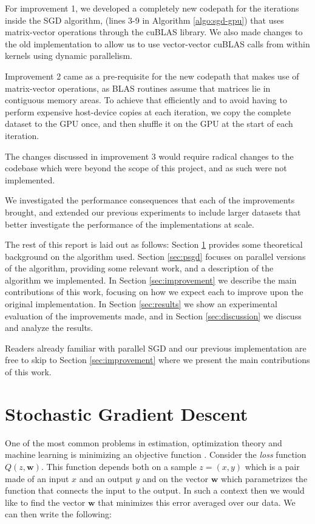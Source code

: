 \documentclass[11pt,a4paper]{article}
\newcommand{\Wb}{\mathbf{w}}
\begin{document}
For improvement 1, we developed a completely new codepath for the iterations inside the SGD algorithm,
(lines 3-9 in Algorithm \ref{algo:sgd-gpu}) that uses matrix-vector operations through the cuBLAS library.
We also made changes to the old  implementation to allow us to use vector-vector cuBLAS calls from within kernels using 
dynamic parallelism.

Improvement 2 came as a pre-requisite for the new codepath that makes use of matrix-vector operations,
as BLAS routines assume that matrices lie in contiguous memory areas. To achieve that efficiently and to avoid
having to perform expensive host-device copies at each iteration, we copy the complete dataset to the GPU
once, and then shuffle it on the GPU at the start of each iteration.

The changes discussed in improvement 3 would require radical changes to the codebase which were beyond the scope
of this project, and as such were not implemented.

We investigated the performance consequences that each of the improvements brought, and extended our previous
experiments to include larger datasets that better investigate the performance of the implementations at scale.

The rest of this report is laid out as follows: Section \ref{sec:sgd} provides some theoretical background
on the algorithm used. Section \ref{sec:psgd} focuses on parallel versions of the algorithm, providing some
relevant work, and a description of the algorithm we implemented. In Section \ref{sec:improvement} we describe
the main contributions of this work, focusing on how we expect each to improve upon the original implementation.
In Section \ref{sec:results} we show an experimental evaluation of the improvements made, and in Section \ref{sec:discussion}
we discuss and analyze the results.

Readers already familiar with parallel SGD and our previous implementation are free to skip to Section \ref{sec:improvement}
where we present the main contributions of this work.

\section{Stochastic Gradient Descent}
\label{sec:sgd}


One of the most common problems in estimation, optimization theory and machine learning is
minimizing an objective function \cite{bottou2010large}. Consider the \textit{loss} function $Q(z,
\Wb)$. This function depends both on a sample $z=(x, y)$ which is a pair made of an input $x$ and an
output $y$ and on the vector $\Wb$ which parametrizes the function that connects the input to the
output.
In such a context then we would like to find the vector $\Wb$ that minimizes this error averaged
over our data. We can then write the following:
\end{document}
